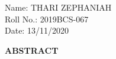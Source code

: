 \documentclass[12pt]{article}
\begin{document}
Name: THARI ZEPHANIAH \\
Roll No.: 2019BCS-067  \\
Date: 13/11/2020   \\
\clearpage


\topmargin=-1in    
\textheight=24cm  
\oddsidemargin=0pt %
\textwidth=6.5in   %

\begin{center}
{\large \bf ABSTRACT}
\end{center}  
\end{document}
